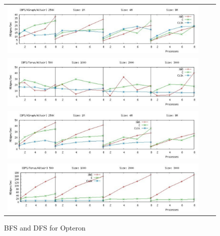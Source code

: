 \newpage
\onecolumn
\begin{figure}
 \begin{tabular}{ccc}
\includegraphics[width=14cm]{../plots/bfs-kgraph-altair-color.pdf} \\
\includegraphics[width=14cm] {../plots/bfs-torus-altair-color.pdf} \\
\includegraphics[width=14cm]{../plots/dfs-kgraph-altair-color.pdf}\\
\includegraphics[width=14cm]{../plots/dfs-torus-altair-color.pdf}\\
\end{tabular}
\caption{BFS and DFS for Opteron}\label{altair}
\end{figure}


